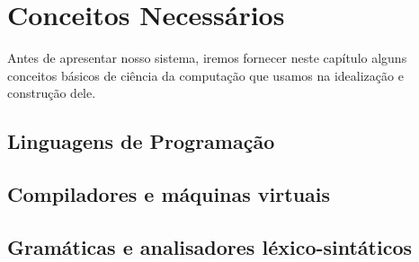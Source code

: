 
\chapter{Conceitos Necessários}
\label{cap:conceitos}

  Antes de apresentar nosso sistema, iremos fornecer neste capítulo alguns
  conceitos básicos de ciência da computação que usamos na idealização e
  construção dele.

  \section{Linguagens de Programação}
  \label{cap:conceitos:linguagens}

  \section{Compiladores e máquinas virtuais}
  \label{cap:conceitos:compiladores}

  \section{Gramáticas e analisadores léxico-sintáticos}
  \label{cap:conceitos:gramaticas}

